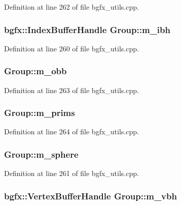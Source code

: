 Definition at line 262 of file bgfx\+\_\+utils.\+cpp.

\hypertarget{struct_group_a7e9013fc37976b5cd6a2c4f77fd8a972}{
\subsubsection[{m\+\_\+ibh}]{\setlength{\rightskip}{0pt plus 5cm}bgfx\+::\+Index\+Buffer\+Handle Group\+::m\+\_\+ibh}}\label{struct_group_a7e9013fc37976b5cd6a2c4f77fd8a972}


Definition at line 260 of file bgfx\+\_\+utils.\+cpp.

\hypertarget{struct_group_a91c5eebd60cd5bea644020ac0dff47e9}{
\subsubsection[{m\+\_\+obb}]{ Group\+::m\+\_\+obb}}\label{struct_group_a91c5eebd60cd5bea644020ac0dff47e9}


Definition at line 263 of file bgfx\+\_\+utils.\+cpp.

\hypertarget{struct_group_aa296b3c707e5db98c811f52942e59517}{
\subsubsection[{m\+\_\+prims}]{ Group\+::m\+\_\+prims}}\label{struct_group_aa296b3c707e5db98c811f52942e59517}


Definition at line 264 of file bgfx\+\_\+utils.\+cpp.

\hypertarget{struct_group_a1b2aca67af27c4d036dc8b1e3c424ae1}{
\subsubsection[{m\+\_\+sphere}]{ Group\+::m\+\_\+sphere}}\label{struct_group_a1b2aca67af27c4d036dc8b1e3c424ae1}


Definition at line 261 of file bgfx\+\_\+utils.\+cpp.

\hypertarget{struct_group_acdc9cdc7dba88683905bec591763eaf8}{
\subsubsection[{m\+\_\+vbh}]{\setlength{\rightskip}{0pt plus 5cm}bgfx\+::\+Vertex\+Buffer\+Handle Group\+::m\+\_\+vbh}}\label{struct_group_acdc9cdc7dba88683905bec591763eaf8}


